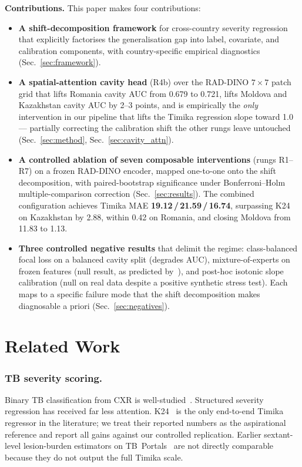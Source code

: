\documentclass[runningheads]{llncs}
\begin{document}
\smallskip\noindent\textbf{Contributions.}
This paper makes four contributions:
\begin{itemize}
\item \textbf{A shift-decomposition framework} for cross-country severity regression that explicitly factorises the generalisation gap into label, covariate, and calibration components, with country-specific empirical diagnostics (Sec.~\ref{sec:framework}).

\item \textbf{A spatial-attention cavity head} (R4b) over the RAD-DINO $7{\times}7$ patch grid that lifts Romania cavity AUC from 0.679 to 0.721, lifts Moldova and Kazakhstan cavity AUC by 2--3 points, and is empirically the \emph{only} intervention in our pipeline that lifts the Timika regression slope toward 1.0 --- partially correcting the calibration shift the other rungs leave untouched (Sec.~\ref{sec:method}, Sec.~\ref{sec:cavity_attn}).

\item \textbf{A controlled ablation of seven composable interventions} (rungs R1--R7) on a frozen RAD-DINO encoder, mapped one-to-one onto the shift decomposition, with paired-bootstrap significance under Bonferroni--Holm multiple-comparison correction (Sec.~\ref{sec:results}). The combined configuration achieves Timika MAE \textbf{19.12\,/\,21.59\,/\,16.74}, surpassing K24 on Kazakhstan by 2.88, within 0.42 on Romania, and closing Moldova from 11.83 to 1.13.

\item \textbf{Three controlled negative results} that delimit the regime: class-balanced focal loss on a balanced cavity split (degrades AUC), mixture-of-experts on frozen features (null result, as predicted by~\cite{gulrajani2021domainbed}), and post-hoc isotonic slope calibration (null on real data despite a positive synthetic stress test). Each maps to a specific failure mode that the shift decomposition makes diagnosable a priori (Sec.~\ref{sec:negatives}).
\end{itemize}

\section{Related Work}

\subsubsection{TB severity scoring.}
Binary TB classification from CXR is well-studied~\cite{liu2020tbx11k,jaeger2014shenzhen}. Structured severity regression has received far less attention. K24~\cite{kantipudi2024} is the only end-to-end Timika regressor in the literature; we treat their reported numbers as the aspirational reference and report all gains against our controlled replication. Earlier sextant-level lesion-burden estimators on TB~Portals~\cite{tbportals2020} are not directly comparable because they do not output the full Timika scale.
\end{document}
